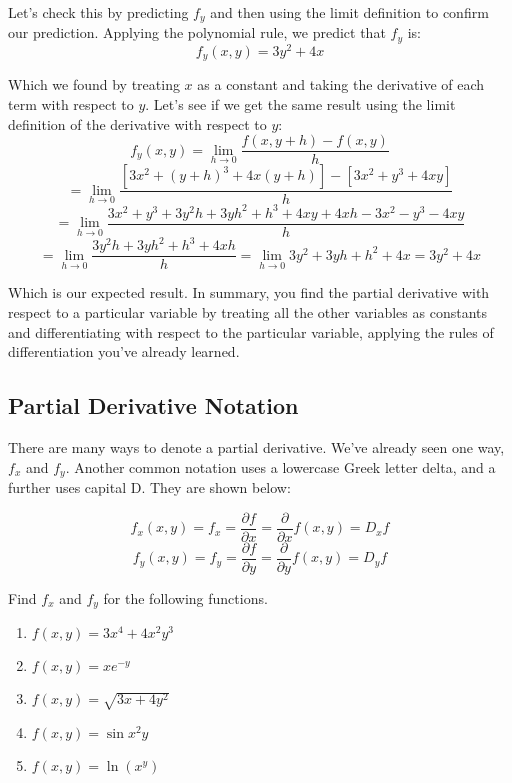 Let's check this by predicting $f_y$ and then using the limit definition to 
confirm our prediction. Applying the polynomial rule, we predict that $f_y$ is:
$$f_y(x, y) = 3y^2 + 4x$$

Which we found by treating $x$ as a constant and taking the derivative of each 
term with respect to $y$. Let's see if we get the same result using the limit 
definition of the derivative with respect to $y$:
$$f_y(x, y) = \lim_{h \to 0} \frac{f(x, y + h) - f(x, y)}{h}$$
$$= \lim_{h \to 0} \frac{\left[3x^2 + \left(y + h \right)^3 + 4x \left(y + h 
\right) \right] - \left[ 3x^2 + y^3 + 4xy \right]}{h}$$
$$= \lim_{h \to 0} \frac{3x^2 + y^3 + 3y^2h + 3yh^2 + h^3 + 4xy + 4xh - 3x^2 - 
y^3 - 4xy}{h}$$
$$= \lim_{h \to 0} \frac{3y^2h + 3yh^2 + h^3 + 4xh}{h} = \lim_{h \to 0} 3y^2 + 
3yh + h^2 + 4x = 3y^2 + 4x$$

Which is our expected result. In summary, you find the partial derivative with 
respect to a particular variable by treating all the other variables as 
constants and differentiating with respect to the particular variable, applying
the rules of differentiation you've already learned. 

\subsection{Partial Derivative Notation}
There are many ways to denote a partial derivative. We've already seen one way,
$f_x$ and $f_y$. Another common notation uses a lowercase Greek letter delta, 
and a further uses capital D. They are shown below:

\begin{mdframed}[style = important, frametitle = {Partial Derivative Notations}]
$$f_x(x, y) = f_x = \frac{\partial f}{\partial x} = \frac{\partial}{\partial x}
f(x, y) = D_x f$$
$$f_y(x, y) = f_y = \frac{\partial f}{\partial y} = \frac{\partial}{\partial y}
f(x, y) = D_y f$$
\end{mdframed}

\begin{Exercise}[title = {First Partial Derivatives}, label = first]
Find $f_x$ and $f_y$ for the following functions.
\begin{enumerate}
\item $f(x, y) = 3x^4 + 4x^2y^3$
\item $f(x, y) = xe^{-y}$
\item $f(x, y) = \sqrt{3x + 4y^2}$
\item $f(x, y) = \sin{x^2y}$
\item $f(x, y) = \ln{ \left(x^y \right)}$
\end{enumerate}
\vspace{50mm}
\end{Exercise}

